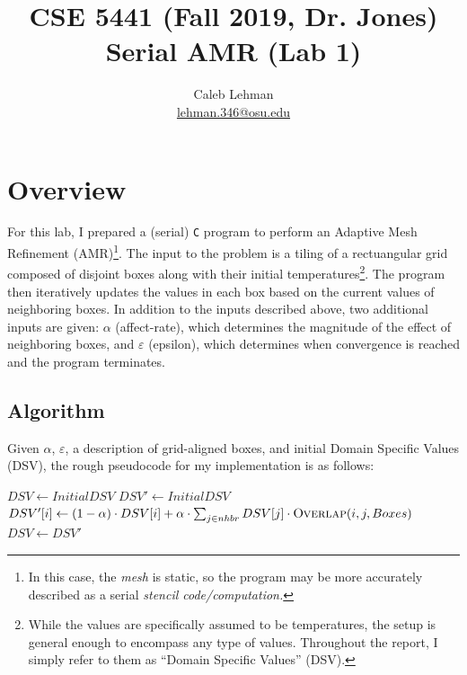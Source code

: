 \documentclass{article}
\title{
CSE 5441 (Fall 2019, Dr. Jones)\\
\large Serial AMR (Lab 1)
}
\author{
Caleb Lehman \\
\href{mailto:lehman.346@osu.edu}{lehman.346@osu.edu}
}
\begin{document}
\maketitle

\section*{Overview}
\label{sec:overview}

For this lab, I prepared a (serial) \texttt{C} program to perform an
Adaptive Mesh Refinement (AMR)\footnote{In this case, the \emph{mesh} is static,
so the program may be more accurately described as a serial \emph{stencil
code/computation.}}. The input to the problem is a tiling of a rectuangular
grid composed of disjoint boxes along with their initial
temperatures\footnote{While the values are specifically assumed to be temperatures,
the setup is general enough to encompass any type of values. Throughout the
report, I simply refer to them as ``Domain Specific Values'' (DSV).}. The
program then iteratively updates the values in each box based on the current
values of neighboring boxes. In addition to the inputs described above, two
additional inputs are given: $\alpha$ (affect-rate), which determines the
magnitude of the effect of neighboring boxes, and $\varepsilon$ (epsilon),
which determines when convergence is reached and the program terminates.

\subsection*{Algorithm}
\label{subsec:algorithm}

Given $\alpha$, $\varepsilon$, a description of grid-aligned boxes, and initial
Domain Specific Values (DSV), the rough pseudocode for my implementation is as
follows:

\begin{algorithm}
\begin{algorithmic}[1]
\State $DSV \gets Initial DSV$
\State $DSV' \gets Initial DSV$
 \label{alg:amr:convergence}
        \State $DSV'[i] \gets (1 - \alpha)\cdot DSV[i] + \alpha \cdot \sum_{j\in nhbr} DSV[j]\cdot \Call{Overlap}{i, j, Boxes}$ \label{alg:amr:stencil}
    \EndFor
    \State $DSV \gets DSV'$ \label{alg:amr:commit}
\EndWhile
\EndProcedure
\end{algorithmic}
\end{algorithm}
\end{document}
